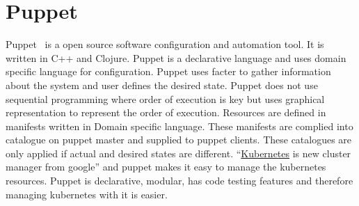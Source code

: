 \section{Puppet}

Puppet~\cite{hid-sp18-413-Puppet} is a open source software configuration and
automation tool. It is written in C++ and Clojure. Puppet is a declarative
language and uses domain specific language for configuration. Puppet uses facter
to gather information about the system and user defines the desired
state. Puppet does not use sequential programming where order of execution is
key but uses graphical representation to represent the order of
execution. Resources are defined in manifests written in Domain specific
language. These manifests are complied into catalogue on puppet master and
supplied to puppet clients. These catalogues are only applied if actual and
desired states are different.
“\href{https://en.wikipedia.org/wiki/Kubernetes}{Kubernetes} is new cluster
manager from google” and puppet makes it easy to manage the kubernetes
resources. Puppet is declarative, modular, has code testing features and
therefore managing kubernetes with it is easier.
